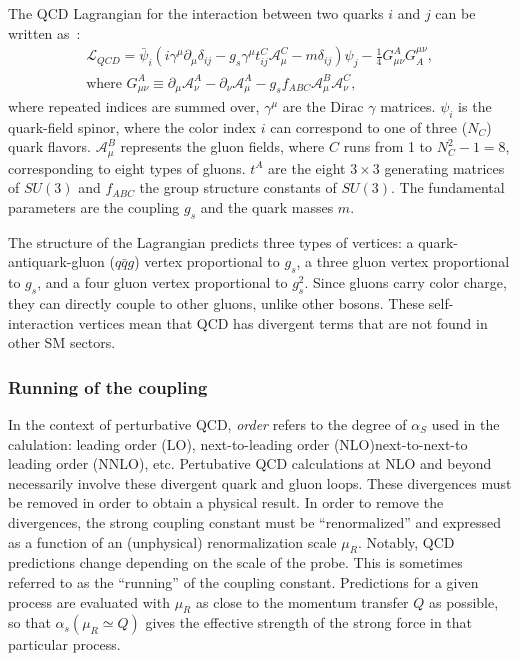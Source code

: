 The QCD Lagrangian for the interaction between two quarks $i$ and $j$ can be written as~\cite{PDG}:
\begin{eqnarray}
\mathcal{L}_{QCD} = \bar{\psi}_i(i\gamma^{\mu}\partial_{\mu}\delta_{ij} - g_s\gamma^\mu t^C_{ij}\mathcal{A}^C_\mu -m\delta_{ij})\psi_j -\frac{1}{4}G^{A}_{\mu\nu}G^{\mu\nu}_A,\\
\mbox{where } G^A_{\mu\nu} \equiv \partial_\mu \mathcal{A}^A_{\nu}-\partial_\nu \mathcal{A}^A_{\mu} - g_s f_{ABC} \mathcal{A}^B_{\mu} \mathcal{A}^C_{\nu},
\end{eqnarray}
where repeated indices are summed over, $\gamma^{\mu}$ are the Dirac $\gamma$ matrices. ${\psi}_i$ is the quark-field spinor, where the color index $i$ can correspond to one of three ($N_C$) quark flavors. $\mathcal{A}^{B}_{\mu}$ represents the gluon fields, where $C$ runs from 1 to $N_C^2-1=8$, corresponding to eight types of gluons. $t^{A}$ are the eight $3 \times 3$ generating matrices of $SU(3)$ and $f_{ABC}$ the group structure constants of $SU(3)$. The fundamental parameters are the coupling $g_s$ and the quark masses $m$.

The structure of the Lagrangian predicts three types of vertices: a quark-antiquark-gluon ($q\bar{q}g$) vertex proportional to $g_s$, a three gluon vertex  proportional to $g_s$, and a four gluon vertex proportional to $g_s^2$. Since gluons carry color charge, they can directly couple to other gluons, unlike other bosons. These self-interaction vertices mean that QCD has divergent terms that are not found in other SM sectors.
\subsubsection{Running of the coupling}

In the context of perturbative QCD, \emph{order} refers to the degree of $\alpha_S$ used in the calulation: leading order (LO), next-to-leading order (NLO)next-to-next-to leading order (NNLO), etc. Pertubative QCD calculations at NLO and beyond necessarily involve these divergent quark and gluon loops. These divergences must be removed in order to obtain a physical result. In order to remove the divergences, the strong coupling constant must be ``renormalized'' and expressed as a function of an (unphysical) renormalization scale $\mu_R$. Notably, QCD predictions change depending on the scale of the probe. This is sometimes referred to as the ``running'' of the coupling constant. Predictions for a given process are evaluated with $\mu_R$ as close to the momentum transfer $Q$ as possible, so that $\alpha_s(\mu_R \simeq Q)$ gives the effective strength of the strong force in that particular process. 

